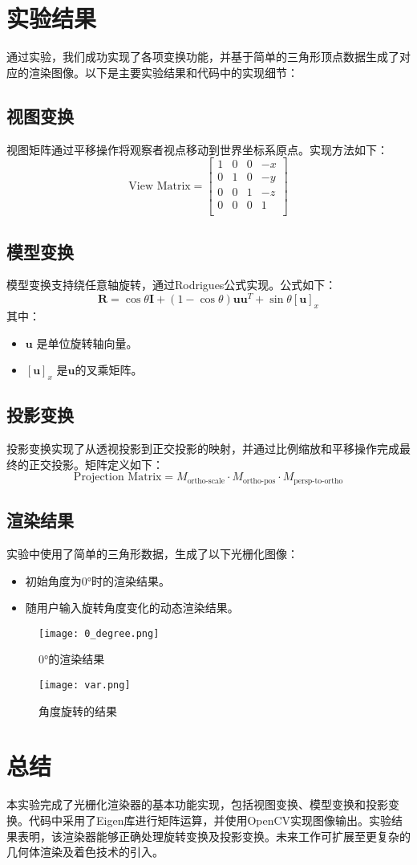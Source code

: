 \documentclass[a4paper,12pt]{article}
\begin{document}
\section{实验结果}
通过实验，我们成功实现了各项变换功能，并基于简单的三角形顶点数据生成了对应的渲染图像。以下是主要实验结果和代码中的实现细节：

\subsection*{视图变换}
视图矩阵通过平移操作将观察者视点移动到世界坐标系原点。实现方法如下：
\[
\text{View Matrix} = 
\begin{bmatrix}
1 & 0 & 0 & -x \\
0 & 1 & 0 & -y \\
0 & 0 & 1 & -z \\
0 & 0 & 0 & 1 \\
\end{bmatrix}
\]

\subsection*{模型变换}
模型变换支持绕任意轴旋转，通过Rodrigues公式实现。公式如下：
\[
\mathbf{R} = \cos\theta \mathbf{I} + (1-\cos\theta) \mathbf{u}\mathbf{u}^T + \sin\theta [\mathbf{u}]_x
\]
其中：
\begin{itemize}
    \item \(\mathbf{u}\) 是单位旋转轴向量。
    \item \([\mathbf{u}]_x\) 是\(\mathbf{u}\)的叉乘矩阵。
\end{itemize}

\subsection*{投影变换}
投影变换实现了从透视投影到正交投影的映射，并通过比例缩放和平移操作完成最终的正交投影。矩阵定义如下：
\[
\text{Projection Matrix} = M_\text{ortho-scale} \cdot M_\text{ortho-pos} \cdot M_\text{persp-to-ortho}
\]

\subsection*{渲染结果}
实验中使用了简单的三角形数据，生成了以下光栅化图像：
\begin{itemize}
    \item 初始角度为0°时的渲染结果。
    \item 随用户输入旋转角度变化的动态渲染结果。
\end{itemize}
\begin{figure}
    \centering
    \texttt{[image: 0\_degree.png]}
    \caption{0°的渲染结果}
    \label{fig:0_degree}
\end{figure}
\begin{figure}
    \centering
    \texttt{[image: var.png]}
    \caption{角度旋转的结果}
    \label{fig:var}
\end{figure}
\section*{总结}
本实验完成了光栅化渲染器的基本功能实现，包括视图变换、模型变换和投影变换。代码中采用了Eigen库进行矩阵运算，并使用OpenCV实现图像输出。实验结果表明，该渲染器能够正确处理旋转变换及投影变换。未来工作可扩展至更复杂的几何体渲染及着色技术的引入。
\end{document}
